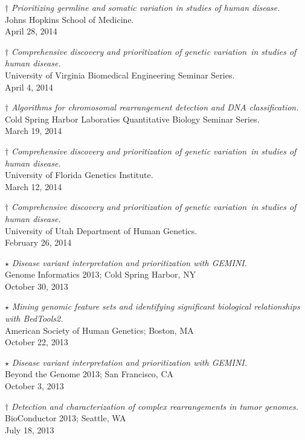 \documentclass[margin,line]{cv}
\begin{document}
\begin{resume}
    $\dagger$ \textit{Prioritizing germline and somatic variation in studies of human disease.} \\
    Johns Hopkins School of Medicine. \\
    April 28, 2014

    $\dagger$ \textit{Comprehensive discovery and prioritization of genetic variation in studies of human disease.} \\
    University of Virginia Biomedical Engineering Seminar Series. \\
    April 4, 2014

    $\dagger$ \textit{Algorithms for chromosomal rearrangement detection and DNA classification.} \\
    Cold Spring Harbor Laboraties Quantitative Biology Seminar Series. \\
    March 19, 2014

    $\dagger$ \textit{Comprehensive discovery and prioritization of genetic variation in studies of human disease.} \\
    University of Florida Genetics Institute. \\
    March 12, 2014

    $\dagger$ \textit{Comprehensive discovery and prioritization of genetic variation in studies of human disease.} \\
    University of Utah Department of Human Genetics. \\
    February 26, 2014

    $\star$ \textit{Disease variant interpretation and prioritization with GEMINI.} \\
    Genome Informatics 2013; Cold Spring Harbor, NY \\
    October 30, 2013

    $\star$ \textit{Mining genomic feature sets and identifying significant biological relationships with BedTools2.} \\
    American Society of Human Genetics; Boston, MA \\
    October 22, 2013

    $\star$ \textit{Disease variant interpretation and prioritization with GEMINI.} \\
    Beyond the Genome 2013; San Francisco, CA \\
    October 3, 2013

    $\dagger$ \textit{Detection and characterization of complex rearrangements in
	tumor genomes.} \\
    BioConductor 2013; Seattle, WA \\
    July 18, 2013


\end{resume}
\end{document}
